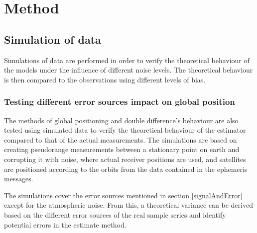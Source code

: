 

\chapter{Method}
\section{Simulation of data}
Simulations of data are performed in order to verify the theoretical behaviour of the models under the influence of different noise levels. The theoretical behaviour is then compared to the observations using different levels of bias.
\subsection{Testing different error sources impact on global position}
The methods of global positioning and double difference's behaviour are also tested using simulated data to verify the theoretical behaviour of the estimator compared to that of the actual measurements. The simulations are based on creating pseudorange measurements between a stationary point on earth and corrupting it with noise, where actual receiver positions are used, and satellites are positioned according to the orbits from the data contained in the ephemeris messages. 
\par 
The simulations cover the error sources mentioned in section \ref{signalAndError} except for the atmospheric noise. From this, a theoretical variance can be derived based on the different error sources of the real sample series and identify potential errors in the estimate method. 

